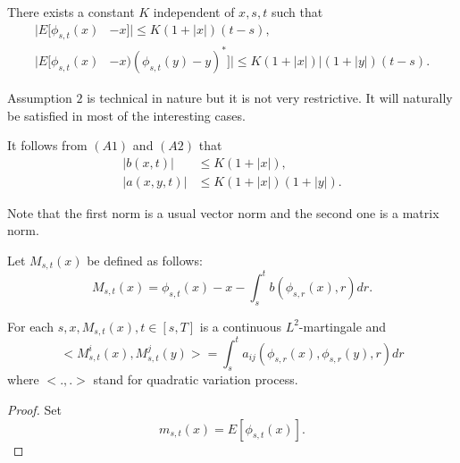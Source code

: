 \begin{Assumption}\label{c1:asm2} %
  There exists a constant $K$ independent of $x,s,t$ such that 
  \begin{align*}
    |E[\phi_{s,t}(x) & - x] | \le K (1+ |x|) (t-s),  \tag{1.2.1}\label{c1:eq1.2.1}\\
    |E[\phi_{s,t}(x) & - x)(\phi_{s,t}(y) - y)^* ] | \le K (1+|x|)
    |(1+|y|) (t-s).\tag{1.2.2}\label{c1:eq1.2.2} 
  \end{align*}
\end{Assumption}

\begin{remark}\label{c1:rem1.2.1} %
  Assumption $2$ is technical in nature but it is not very
  restrictive. It will naturally be satisfied in most of the
  interesting cases.  
\end{remark}

\begin{remark}\label{c1:rem1.2.2} %
  It follows from $(A1)$ and $(A2)$ that
  \begin{align*}
    |b(x,t)| & \le K(1+|x|), \tag{1.2.3}\label{c1:eq1.2.3}\\
    |a(x,y,t)| & \le K(1+|x|)(1+|y|). \tag{1.2.4}\label{c1:eq1.2.4}
  \end{align*}
\end{remark}

Note that the first norm is a usual vector norm and the second one is
a matrix norm. 

Let $M_{s,t}(x)$ be defined as follows: 
\begin{equation*}
  M_{s,t}(x) = \phi_{s,t}(x) - x - 
\int^t_s b(\phi_{s,r}(x),r) dr. \tag{1.2.5}\label{c1:eq1.2.5}
\end{equation*}

\setcounter{Lemma}{2}
\begin{Lemma}\label{c1:lem1.2.3} %
  For each $s,x, M_{s,t}(x), t \in [s,T]$ is a continuous
  $L^2$-martingale and  
  \begin{equation*}
    < M^i_{s,t}(x), M^j_{s,t}(y) > = \int^t_s a_{ij}(\phi_{s,r}(x),
    \phi_{s,r}(y),r)dr \tag{1.2.6}\label{c1:eq1.2.6} 
  \end{equation*} 
  where $<.,.>$ stand for quadratic variation process.
\end{Lemma}

\begin{proof}
  Set 
  \begin{equation*}
    m_{s,t}(x) = E[\phi_{s,t}(x)]. 
\tag{1.2.7}\label{c1:eq1.2.7}
  \end{equation*}
\end{proof}

